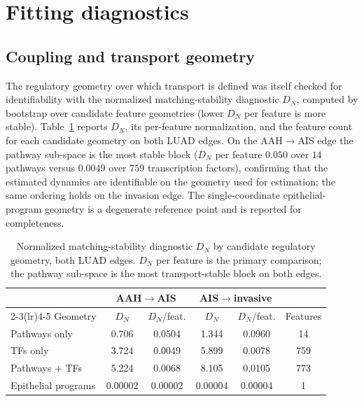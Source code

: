 \section{Fitting diagnostics}\label{sec:app-c-fitting}

\subsection{Coupling and transport geometry}\label{sec:app-c-coupling}

The regulatory geometry over which transport is defined was itself checked for identifiability with
the normalized matching-stability diagnostic $D_N$, computed by bootstrap over candidate feature
geometries (lower $D_N$ per feature is more stable). Table~\ref{tab:app-c-dn} reports $D_N$, its
per-feature normalization, and the feature count for each candidate geometry on both LUAD edges. On
the AAH$\rightarrow$AIS edge the pathway sub-space is the most stable block
($D_N$ per feature $0.050$ over $14$ pathways versus $0.0049$ over $759$ transcription factors),
confirming that the estimated dynamics are identifiable on the geometry used for estimation; the
same ordering holds on the invasion edge. The single-coordinate epithelial-program geometry is a
degenerate reference point and is reported for completeness.

\begin{table}[htbp]
  \centering
  \caption[Transport-stability geometry diagnostic $D_N$]{Normalized matching-stability diagnostic
  $D_N$ by candidate regulatory geometry, both LUAD edges. $D_N$ per feature is the primary
  comparison; the pathway sub-space is the most transport-stable block on both edges.}
  \label{tab:app-c-dn}
  \footnotesize
  \begin{tabular}{lccccc}
    \toprule
    & \multicolumn{2}{c}{AAH$\rightarrow$AIS} & \multicolumn{2}{c}{AIS$\rightarrow$invasive} & \\
    \cmidrule(lr){2-3}\cmidrule(lr){4-5}
    Geometry & $D_N$ & $D_N$/feat. & $D_N$ & $D_N$/feat. & Features \\
    \midrule
    Pathways only            & 0.706 & 0.0504 & 1.344 & 0.0960 & 14 \\
    TFs only                 & 3.724 & 0.0049 & 5.899 & 0.0078 & 759 \\
    Pathways $+$ TFs         & 5.224 & 0.0068 & 8.105 & 0.0105 & 773 \\
    Epithelial programs      & 0.00002 & 0.00002 & 0.00004 & 0.00004 & 1 \\
    \bottomrule
  \end{tabular}
\end{table}

